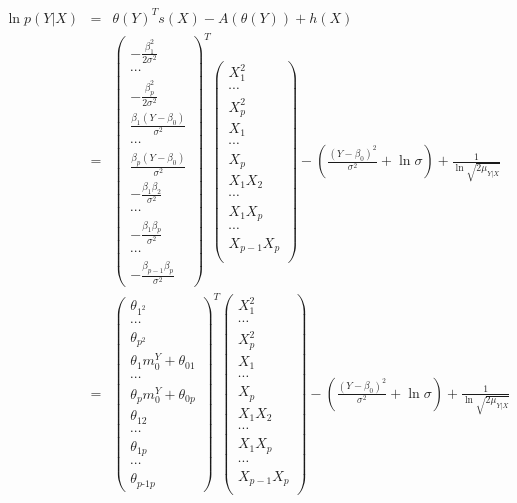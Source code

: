 \documentclass[11pt, oneside]{article}   	%
\numberwithin{figure}{section}
\numberwithin{equation}{section}
\numberwithin{table}{section}
\begin{document}
\begin{eqnarray*}
\ln p(Y|X) &=& \theta(Y)^T s(X) - A(\theta(Y)) + h(X)\\
&=&
\begin{pmatrix}
-\frac{\beta_1^2}{2\sigma^2}\\
\cdots\\
-\frac{\beta_p^2}{2\sigma^2}\\
\frac{\beta_1(Y-\beta_0)}{\sigma^2}\\
\cdots\\
\frac{\beta_p(Y-\beta_0)}{\sigma^2}\\
-\frac{\beta_1\beta_2}{\sigma^2}\\
\cdots\\
-\frac{\beta_1\beta_p}{\sigma^2}\\
\cdots\\
-\frac{\beta_{p-1}\beta_p}{\sigma^2}
\end{pmatrix}^T
\begin{pmatrix}
X_1^2\\
\cdots\\
X_p^2\\
X_1\\
\cdots\\
X_p\\
X_1 X_2\\
\cdots\\
X_1 X_p\\
\cdots\\
X_{p-1}X_{p}\\
\end{pmatrix}
- \left( \frac{(Y-\beta_0)^2}{\sigma^2} + \ln{\sigma} \right) + \frac{1}{\ln{\sqrt{2\mu_{Y|X}}}}\\
&=&
\begin{pmatrix}
\theta_{1^2}\\
\cdots\\
\theta_{p^2}\\
\theta_1 m_0^Y+\theta_{01}\\
\cdots\\
\theta_p m_0^Y+\theta_{0p}\\
\theta_{12}\\
\cdots\\
\theta_{1p}\\
\cdots\\
\theta_{p\mbox{-}1p}
\end{pmatrix}^T
\begin{pmatrix}
X_1^2\\
\cdots\\
X_p^2\\
X_1\\
\cdots\\
X_p\\
X_1 X_2\\
\cdots\\
X_1 X_p\\
\cdots\\
X_{p-1}X_{p}\\
\end{pmatrix}
- \left( \frac{(Y-\beta_0)^2}{\sigma^2} + \ln{\sigma} \right) + \frac{1}{\ln{\sqrt{2\mu_{Y|X}}}}
\end{eqnarray*}





%
%
\end{document}
